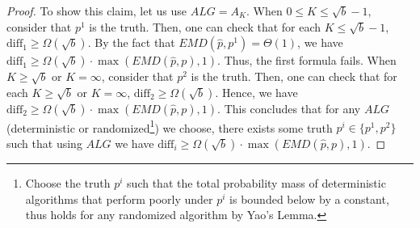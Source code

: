 \begin{proof}
To show this claim, let us use $ALG = A_K$. When $0 \leq K \leq \sqrt{b}-1$, consider that $p^1$ is the truth. Then, one can check that for each $K \leq \sqrt{b}-1$, $\text{diff}_1 \geq \Omega(\sqrt{b})$. By the fact that $EMD(\hat{p},p^1) = \Theta(1)$, we have $\text{diff}_1 \geq \Omega(\sqrt{b})\cdot \max(EMD(\hat{p},p),1)$. Thus, the first formula fails. When $K \geq \sqrt{b}$ or $K=\infty$, consider that $p^2$ is the truth. Then, one can check that for each $K \geq \sqrt{b}$ or $K=\infty$, $\text{diff}_2 \geq \Omega(\sqrt{b})$. Hence, we have $\text{diff}_2 \geq \Omega(\sqrt{b})\cdot \max(EMD(\hat{p},p),1)$. This concludes that for any $ALG$ (deterministic or randomized\footnote{Choose the truth $p^i$ such that the total probability mass of deterministic algorithms that perform poorly under $p^i$ is bounded below by a constant, thus holds for any randomized algorithm by Yao's Lemma.}) we choose, there exists some truth $p^i \in \{p^1,p^2\}$ such that using $ALG$ we have $\text{diff}_i \geq \Omega(\sqrt{b})\cdot \max(EMD(\hat{p},p),1)$.
\end{proof}